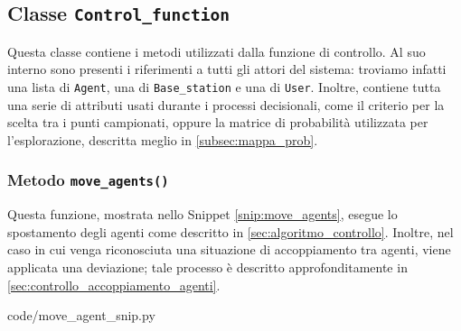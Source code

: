 \subsection{Classe \texttt{Control\_function}} \label{subsec:control_function}
Questa classe contiene i metodi utilizzati dalla funzione di controllo.
Al suo interno sono presenti i riferimenti a tutti gli attori del sistema: troviamo infatti una lista di \texttt{Agent}, una di \texttt{Base\_station} e una di \texttt{User}.
Inoltre, contiene tutta una serie di attributi usati durante i processi decisionali, come il criterio per la scelta tra i punti campionati, oppure la matrice di probabilità utilizzata per l'esplorazione, descritta meglio in  \ref{subsec:mappa_prob}.

\subsubsection{Metodo  \texttt{move\_agents()}}
Questa funzione, mostrata nello Snippet \ref{snip:move_agents}, esegue lo spostamento degli agenti come descritto in \ref{sec:algoritmo_controllo}.
Inoltre, nel caso in cui venga riconosciuta una situazione di accoppiamento tra agenti, viene applicata una deviazione; tale processo è descritto approfonditamente in \ref{sec:controllo_accoppiamento_agenti}.


{code/move_agent_snip.py}

